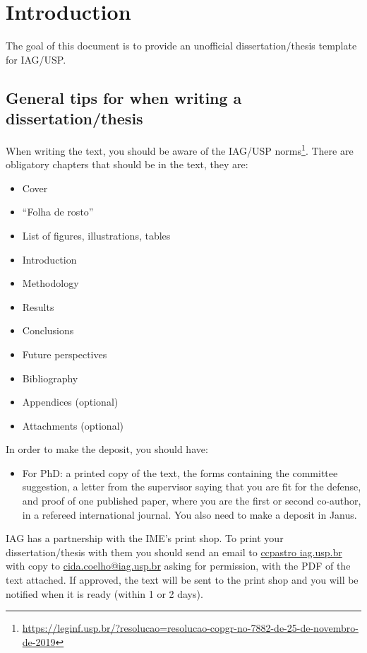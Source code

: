 \setcounter{page}{0}
\chapter{Introduction} \label{cha:introduction}
  The goal of this document is to provide an unofficial dissertation/thesis template for IAG/USP.

  \section{General tips for when writing a dissertation/thesis}

  When writing the text, you should be aware of the IAG/USP norms\footnote{\url{https://leginf.usp.br/?resolucao=resolucao-copgr-no-7882-de-25-de-novembro-de-2019}}. There are obligatory chapters that should be in the text, they are:
  \begin{itemize}
    \item Cover
    \item ``Folha de rosto''
    \item List of figures, illustrations, tables
    \item Introduction
    \item Methodology
    \item Results
    \item Conclusions
    \item Future perspectives
    \item Bibliography
    \item Appendices (optional)
    \item Attachments (optional)
  \end{itemize}

  In order to make the deposit, you should have:
  \begin{itemize}
    \item For PhD: a printed copy of the text, the forms containing the committee suggestion, a letter from the supervisor saying that you are fit for the defense, and proof of one published paper, where you are the first or second co-author, in a refereed international journal. You also need to make a deposit in Janus.
  \end{itemize}

  IAG has a partnership with the IME's print shop. To print your dissertation/thesis with them you should send an email to \url{ccpastro iag.usp.br} with copy to \url{cida.coelho@iag.usp.br} asking for permission, with the PDF of the text attached. If approved, the text will be sent to the print shop and you will be notified when it is ready (within 1 or 2 days).

